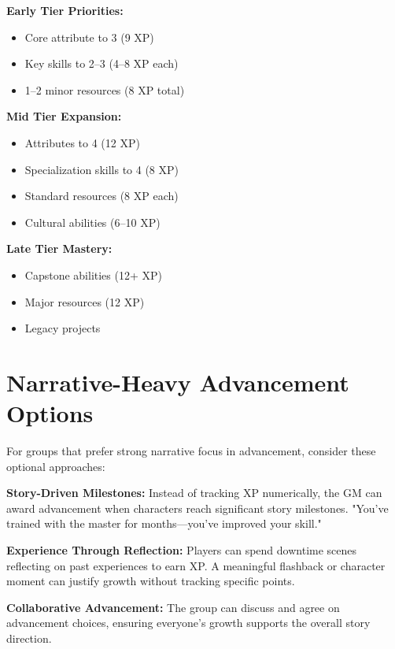 \documentclass[11pt,twoside,openany]{book}
\begin{document}
\begin{tcolorbox}[colback=gray!5!white, colframe=gray!75!black, title=XP Planning Guide, fonttitle=\bfseries]
\textbf{Early Tier Priorities:}
\begin{itemize}
\item Core attribute to 3 (9 XP)
\item Key skills to 2–3 (4–8 XP each)
\item 1–2 minor resources (8 XP total)
\end{itemize}

\textbf{Mid Tier Expansion:}
\begin{itemize}
\item Attributes to 4 (12 XP)
\item Specialization skills to 4 (8 XP)
\item Standard resources (8 XP each)
\item Cultural abilities (6–10 XP)
\end{itemize}

\textbf{Late Tier Mastery:}
\begin{itemize}
\item Capstone abilities (12+ XP)
\item Major resources (12 XP)
\item Legacy projects
\end{itemize}
\end{tcolorbox}

\section*{Narrative-Heavy Advancement Options} 

For groups that prefer strong narrative focus in advancement, consider these optional approaches:

\textbf{Story-Driven Milestones:} Instead of tracking XP numerically, the GM can award advancement when characters reach significant story milestones. "You've trained with the master for months—you've improved your skill."

\textbf{Experience Through Reflection:} Players can spend downtime scenes reflecting on past experiences to earn XP. A meaningful flashback or character moment can justify growth without tracking specific points.

\textbf{Collaborative Advancement:} The group can discuss and agree on advancement choices, ensuring everyone's growth supports the overall story direction.
\end{document}
